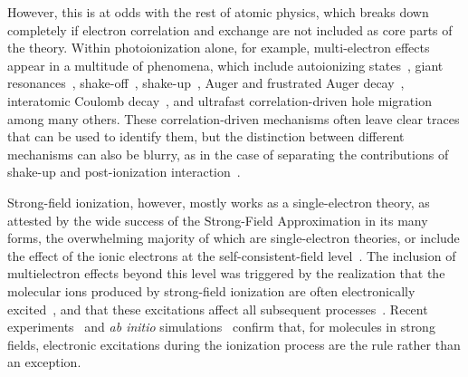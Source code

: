 However, this is at odds with the rest of atomic physics, which breaks down completely if electron correlation and exchange are not included as core parts of the theory. Within photoionization alone, for example, multi-electron effects appear in a multitude of phenomena, which include autoionizing states~\cite{fano_resonances_1961}, giant resonances~\cite{amusia_giant-resonances_2000}, shake-off~\cite{schneider_knockout-shakeoff_2002}, shake-up~\cite{matveev_shakeup_1982}, Auger and frustrated Auger decay~\cite{cooper_auger-decay_2013}, interatomic Coulomb decay~\cite{averbukh_ICD_2004}, and ultrafast correlation-driven hole migration~\cite{cederbaum_ultrafast-charge-migration_1999, kuleff_hole-migration_2005} among many others. These correlation-driven mechanisms often leave clear traces that can be used to identify them, but the distinction between different mechanisms can also be blurry, as in the case of separating the contributions of shake-up and post-ionization interaction~\cite{hino_perturbation-theory-diagrams-gauge_1993}.


Strong-field ionization, however, mostly works as a single-electron theory, as attested by the wide success of the Strong-Field Approximation in its many forms, the overwhelming majority of which are single-electron theories, or include the effect of the ionic electrons at the self-consistent-field level~\cite{pfeiffer_self-consistent-effects_2012}. The inclusion of multielectron effects beyond this level was triggered by the realization that the molecular ions produced by strong-field ionization are often electronically excited~\cite{zon_tunnelling-excitation_2000, litviniuk_shakeup_2005}, and that these excitations affect all subsequent processes~\cite{smirnova_multielectron-hhg_2009, mairesse_high-harmonic-spectroscopy_2010, torres_molecular-structure-and-dynamics-hhg_2010, haessler_attosecond-imaging_2010, lin_rescattering-self-imaging_2010}. Recent experiments~\cite{boguslavskiy_multielectron-ionization_2012, wen_n2o4-excited-ionization_2008} and \textit{ab initio} simulations~\cite{spanner_one-electron_2009,farrell_strong-field-excited-ionization_2011} confirm that, for molecules in strong fields, electronic excitations during the ionization process are the rule rather than an exception.

